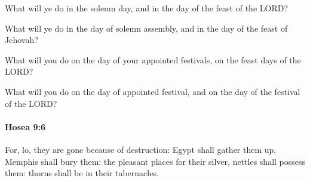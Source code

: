			What will ye do in the solemn day, and in the day of the feast of the LORD?

			\begin{versebox}
					\item[BHS] 
					\item[LXX] 
					\item[ASV] What will ye do in the day of solemn assembly, and in the day of the feast of Jehovah?
					\item[NIV] What will you do on the day of your appointed festivals, on the feast days of the LORD?
					\item[NRSV] What will you do on the day of appointed festival, and on the day of the festival of the LORD?
			\end{versebox}

		\paragraph{Hosea 9:6} %
			\label{HOSEA-9-6}

			For, lo, they are gone because of destruction: Egypt shall gather them up, Memphis shall bury them: the pleasant places for their silver, nettles shall possess them: thorns shall be in their tabernacles.

